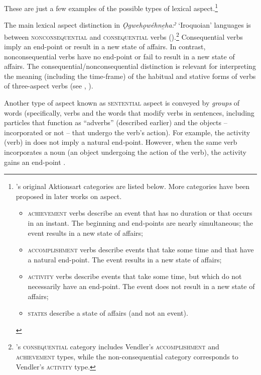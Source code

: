 These are just a few examples of the possible types of lexical aspect.\footnote{\citet{vendler_verbs_1957}’s original Aktionsart categories are listed below. More categories have been proposed in later works on aspect.


\begin{itemize}
\item \textsc{achievement} verbs describe an event that has no duration or that occurs in an instant. The beginning and end-points are nearly simultaneous; the event results in a new state of affairs;
\item \textsc{accomplishment} verbs describe events that take some time and that have a natural end-point. The event results in a new state of affairs;
\item \textsc{activity} verbs describe events that take some time, but which do not necessarily have an end-point. The event does not result in a new state of affairs;
\item \textsc{states} describe a state of affairs (and not an event).
\end{itemize}}


The main lexical aspect distinction in \textit{Ǫgwehǫwéhne̱ha:ˀ} ‘Iroquoian’ languages is between \textsc{nonconsequential} and \textsc{consequential} verbs (\cite{chafe_consequential_1980}).\footnote{\citet{chafe_consequential_1980}’s \textsc{consequential} category includes Vendler’s \textsc{accomplishment} and \textsc{achievement} types, while the non-consequential category corresponds to Vendler’s \textsc{activity} type.} Consequential verbs imply an end-point or result in a new state of affairs. In contrast, nonconsequential verbs have no end-point or fail to result in a new state of affairs. The consequential/nonconsequential distinction is relevant for interpreting the meaning (including the time-frame) of the habitual and stative forms of verbs of three-aspect verbs (see , ). 

Another type of aspect known as \textsc{sentential} aspect is conveyed by \emph{groups} of words (specifically, verbs and the words that modify verbs in sentences, including particles that function as “adverbs” (described earlier) and the objects -- incorporated or not -- that undergo the verb’s action). For example, the activity (verb) in  does not imply a natural end-point. However, when the same verb incorporates a noun (an object undergoing the action of the verb), the activity gains an end-point . 

